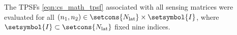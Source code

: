 The \acp{TPSF}
\eqref{eqn:cs_math_tpsf} associated with
all sensing matrices were evaluated for
all $( n_{1}, n_{2} ) \in \setcons{ N_{\text{lat}} } \times \setsymbol{I}$, where
$\setsymbol{I} \subset \setcons{ N_{\text{lat}} }$ fixed
nine indices.
%
